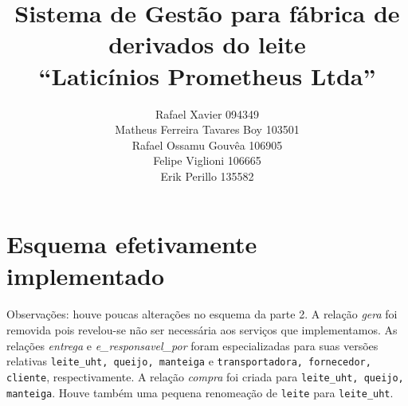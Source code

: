\documentclass[11pt]{article}
\newcommand{\tit}[1]{\textit{#1}}
\newcommand{\ttt}[1]{\texttt{#1}}
\begin{document}
\title{Sistema de Gestão para fábrica de derivados do leite\\
	``Laticínios Prometheus Ltda''}
\author{Rafael Xavier 094349\\
	Matheus Ferreira Tavares Boy 103501\\
	Rafael Ossamu Gouvêa 106905\\
	Felipe Viglioni 106665\\
	Erik Perillo 135582}
\date{}
\maketitle

\newpage

\section{Esquema efetivamente implementado}
\paragraph{}
Observações: houve poucas alterações no esquema da parte 2. 
A relação \tit{gera} foi removida pois 
revelou-se não ser necessária aos serviços que implementamos.
As relações \tit{entrega} e \tit{e\_responsavel\_por} foram especializadas
para suas versões relativas \ttt{leite\_uht, queijo, manteiga} e 
\ttt{transportadora, fornecedor, cliente}, respectivamente. 
A relação \tit{compra} foi criada para \ttt{leite\_uht, queijo, manteiga}.
Houve também uma pequena renomeação de \ttt{leite} para \ttt{leite\_uht}.
\end{document}
